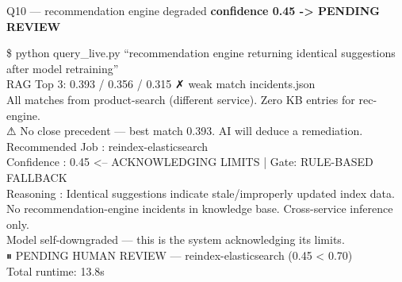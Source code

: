 \begin{frame}{Q10 — recommendation engine degraded}
  {\color{camber}\ttfamily\small\bfseries confidence 0.45 -> PENDING REVIEW}
  \vspace{0.15cm}
  \begin{terminal}
    \$ python query\_live.py ``recommendation engine returning identical suggestions after model retraining''\\

    RAG Top 3: {\color{camber}0.393 / 0.356 / 0.315 ✗ weak match}  incidents.json\\
    \hspace*{0.4cm}All matches from product-search (different service). Zero KB entries for rec-engine.\\

    ⚠ No close precedent — best match 0.393. AI will deduce a remediation.\\

    Recommended Job : {\color{camber}reindex-elasticsearch}\\
    Confidence      : {\color{camber}0.45  <-- ACKNOWLEDGING LIMITS}  |  Gate: {\color{camber}RULE-BASED FALLBACK}\\
    Reasoning       : Identical suggestions indicate stale/improperly updated index data.\\
    \hspace*{0.4cm}No recommendation-engine incidents in knowledge base. Cross-service inference only.\\
    \hspace*{0.4cm}Model self-downgraded --- this is the system acknowledging its limits.\\

    {\color{camber}⏸  PENDING HUMAN REVIEW  —  reindex-elasticsearch  (0.45 < 0.70)}\\
    Total runtime: 13.8s
  \end{terminal}
\end{frame}
